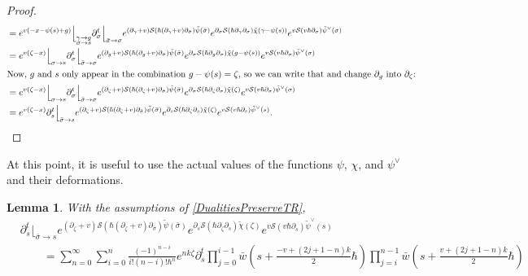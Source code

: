 \documentclass[10pt,a4paper,oneside,no-math,reqno]{amsart}%
\theoremstyle{plain}
\newtheorem{lemma}[theorem]{Lemma}
\theoremstyle{definition}
\theoremstyle{remark}
\numberwithin{equation}{section}
\newcommand{\mc}[1]{\mathcal{#1}}
\newcommand{\1}{\mathds{1}}
\newcommand{\<}{\langle}
\renewcommand{\>}{\rangle}
\newcommand{\del}{\partial}
\begin{document}
\begin{proof}
\begin{align*}
			&=
			e^{v (-x - \psi (s) + g)}
			\Big\lfloor_{\substack{\gamma \to g \\ \sigma \to s}}
			\del_\sigma^t 
			\Big\lfloor_{\bar{\sigma} \to \sigma}
			e^{ (\del_\gamma+v) \mc{S}( \hbar (\del_\gamma + v) \del_{\bar{\sigma}} )\tilde{\psi} (\bar{\sigma}) }
			e^{ \del_\sigma \mc{S}( \hbar \del_\gamma \del_\sigma)\tilde{\chi} (\gamma - \psi (s)) }
			e^{v \mc{S}(v \hbar \del_\sigma) \tilde{\psi}^\vee ( \sigma)}
			\\
			&=
			e^{v (\zeta - x)}
			\Big\lfloor_{\sigma \to s}
			\del_\sigma^t \Big\lfloor_{\bar{\sigma} \to \sigma}
			e^{ (\del_g+v) \mc{S}( \hbar (\del_g + v) \del_{\bar{\sigma}} )\tilde{\psi} (\bar{\sigma}) }
			e^{ \del_\sigma \mc{S}( \hbar \del_g \del_\sigma ) \tilde{\chi} (g - \psi (s)) }
			e^{v \mc{S}(v \hbar \del_\sigma) \tilde{\psi}^\vee (\sigma)} 
			\\
			\intertext{Now, $ g$ and $ s$ only appear in the combination $ g - \psi (s) = \zeta$, so we can write that and change $ \del_g$ into $ \del_\zeta$:}
			&=
			e^{v (\zeta - x)}
			\Big\lfloor_{\sigma \to s}
			\del_\sigma^t \Big\lfloor_{\bar{\sigma} \to \sigma}
			e^{ (\del_\zeta+v) \mc{S}( \hbar (\del_\zeta + v) \del_{\bar{\sigma}} )\tilde{\psi} (\bar{\sigma}) }
			e^{ \del_\sigma \mc{S}( \hbar \del_\zeta \del_\sigma ) \tilde{\chi} (\zeta ) }
			e^{v \mc{S}(v \hbar \del_\sigma) \tilde{\psi}^\vee (\sigma)} 
			\\
			&=
			e^{v (\zeta - x)}
			\del_s^t \Big\lfloor_{\bar{\sigma} \to s}
			e^{ (\del_\zeta+v) \mc{S}( \hbar (\del_\zeta + v) \del_{\bar{\sigma}} )\tilde{\psi} (\bar{\sigma}) }
			e^{ \del_s \mc{S}( \hbar \del_\zeta \del_s ) \tilde{\chi} (\zeta ) }
			e^{v \mc{S}(v \hbar \del_s) \tilde{\psi}^\vee (s)} .
			\qedhere
	\end{align*}
\end{proof}

At this point, it is useful to use the actual values of the functions $ \psi$, $ \chi$, and $ \psi^\vee$ and their deformations.

\begin{lemma}\label{ExplicitDualityChain}
	With the assumptions of \cref{DualitiesPreserveTR},
	\begin{equation}
		\begin{split}
			&\del_s^t \Big\lfloor_{\bar{\sigma} \to s}
			e^{ (\del_\zeta+v) \mc{S}( \hbar (\del_\zeta + v) \del_{\bar{\sigma}} )\tilde{\psi} (\bar{\sigma}) }
			e^{ \del_s \mc{S}( \hbar \del_\zeta \del_s ) \tilde{\chi} (\zeta ) }
			e^{v \mc{S}(v \hbar \del_s) \tilde{\psi}^\vee (s)}
			\\
			&\qquad=
			\sum_{n=0}^\infty \sum_{i = 0}^n \frac{(-1)^{n-i} }{i!(n-i)! \hbar^n } e^{ nk \zeta}
			\del_s^t
			\prod_{j = 0}^{i-1} \bar{w} ( s + \frac{-v+ (2j+1-n) k}{2} \hbar)
			\prod_{j = i}^{n-1} \bar{w} ( s + \frac{ v+ (2j+1-n) k}{2} \hbar)
		\end{split}
	\end{equation}
\end{lemma}
\end{document}
